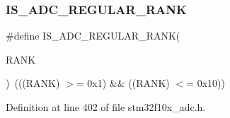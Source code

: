 \subsubsection{\texorpdfstring{I\+S\+\_\+\+A\+D\+C\+\_\+\+R\+E\+G\+U\+L\+A\+R\+\_\+\+R\+A\+NK}{IS\_ADC\_REGULAR\_RANK}}
{\footnotesize\ttfamily \#define I\+S\+\_\+\+A\+D\+C\+\_\+\+R\+E\+G\+U\+L\+A\+R\+\_\+\+R\+A\+NK(\begin{DoxyParamCaption}\item[{}]{R\+A\+NK }\end{DoxyParamCaption})~(((R\+A\+NK) $>$= 0x1) \&\& ((\+R\+A\+N\+K) $<$= 0x10))}



Definition at line 402 of file stm32f10x\+\_\+adc.\+h.

